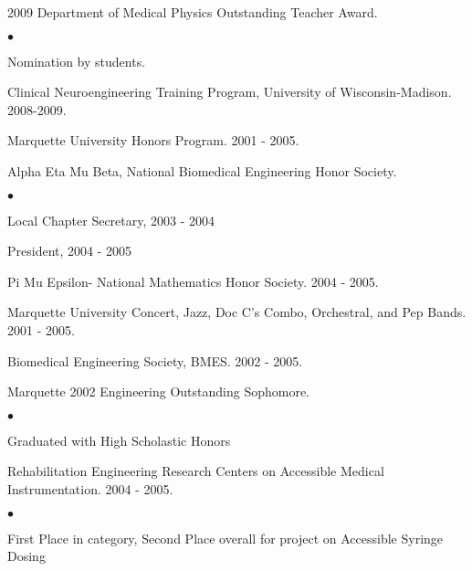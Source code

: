 \documentclass[margin,line]{res}
\newenvironment{list2}{
  \begin{list}{$\bullet$}{%
      \setlength{\itemsep}{0in}
      \setlength{\parsep}{0in} \setlength{\parskip}{0in}
      \setlength{\topsep}{0in} \setlength{\partopsep}{0in}
      \setlength{\leftmargin}{0.2in}}}{\end{list}}
\begin{document}
\begin{resume}
2009 Department of Medical Physics Outstanding Teacher Award.
\begin{list2}
\item  Nomination by students.
\end{list2}

Clinical Neuroengineering Training Program, University of Wisconsin-Madison.
2008-2009.

Marquette University Honors Program. 2001 - 2005.

Alpha Eta Mu Beta, National Biomedical Engineering Honor Society.
\begin{list2}
 \item Local Chapter Secretary, 2003 - 2004
 \item President, 2004 - 2005
\end{list2}

Pi Mu Epsilon- National Mathematics Honor Society. 2004 - 2005.

Marquette University Concert, Jazz, Doc C's Combo, Orchestral, and Pep Bands.
2001 - 2005.

Biomedical Engineering Society, BMES. 2002 - 2005.

Marquette 2002 Engineering Outstanding Sophomore.
\begin{list2}
\item Graduated with High Scholastic Honors
\end{list2}

Rehabilitation Engineering Research Centers on Accessible Medical
Instrumentation. 2004 - 2005.
\begin{list2}
 \item First Place in category, Second Place overall for project on Accessible Syringe Dosing
\end{list2}
%





\end{resume}
\end{document}
